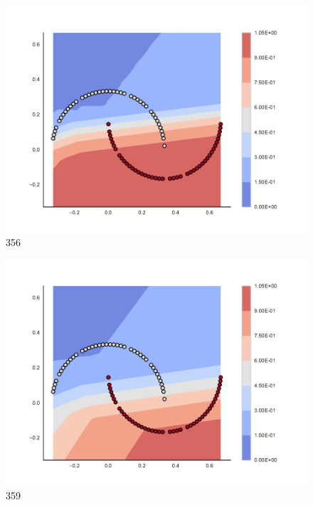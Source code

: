 \begin{subfigure}[b]{0.09\textwidth}
    \includegraphics[clip, trim=2.35cm 1.75cm 4.5cm 0cm,width=\textwidth]{img/convergence/356.pdf}
    \caption{356}
    \label{fig:convergence_356}
\end{subfigure}
%
\begin{subfigure}[b]{0.09\textwidth}
    \includegraphics[clip, trim=2.35cm 1.75cm 4.5cm 0cm,width=\textwidth]{img/convergence/359.pdf}
    \caption{359}
    \label{fig:convergence_359}
\end{subfigure}
%
